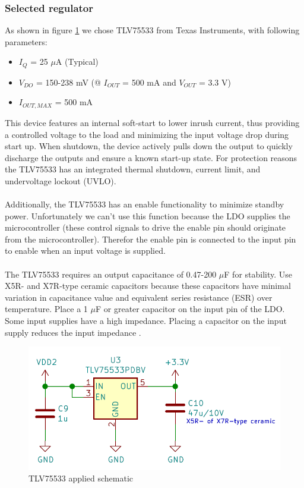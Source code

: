 \documentclass[11pt,a4paper]{article}
\begin{document}
\subsubsection{Selected regulator}
As shown in figure \ref{fig:TLV75533_toegepast} we chose TLV75533 from Texas Instruments, with following parameters:
\begin{itemize}
	\item $I_Q$ = 25 $\mu$A (Typical)
	\item $V_{DO}$ = 150-238 mV (@ $I_{OUT}$ = 500 mA and $V_{OUT}$ = 3.3 V)
	\item $I_{OUT,MAX}$ = 500 mA
\end{itemize}
This device features an internal soft-start to lower inrush current, thus providing a controlled voltage to the load and minimizing the input voltage drop during start up. When shutdown, the device actively pulls down the output to quickly discharge the outputs and ensure a known start-up state. For protection reasons the TLV75533 has an integrated thermal shutdown, current limit, and undervoltage lockout (UVLO). 
\\ \\
Additionally, the TLV75533 has an enable functionality to minimize standby power. Unfortunately we can't use this function because the LDO supplies the microcontroller (these control signals to drive the enable pin should originate from the microcontroller). Therefor the enable pin is connected to the input pin to enable when an input voltage is supplied. 
\\ \\
The TLV75533 requires an output capacitance of 0.47-200 $\mu$F for stability. Use X5R- and X7R-type ceramic capacitors because these capacitors have minimal variation in capacitance value and equivalent series resistance (ESR) over temperature. Place a 1 $\mu$F or greater capacitor on the input pin of the LDO. Some input supplies have a high impedance. Placing a capacitor on the input supply reduces the input impedance \cite{bib:TLV755P}.
\begin{figure}[H]
	\centering
	\includegraphics[width=0.9\linewidth]{TLV75533_toegepast.png}
	\caption{TLV75533 applied schematic}
	\label{fig:TLV75533_toegepast}
\end{figure}
\end{document}
